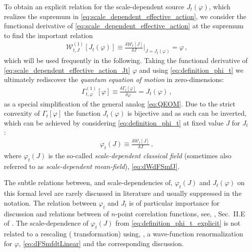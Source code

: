 To obtain an explicit relation for the scale-dependent source $J_t ( \varphi )$, which realizes the supremum in \cref{eq:scale_dependent_effective_action}, we consider the functional derivative of \cref{eq:scale_dependent_effective_action} at the supremum to find the important relation
\begin{align}
	\mathcal{W}_{t,J}^{(1)}[J_t(\varphi)] \equiv \frac{\delta \mathcal{W}_t [J]}{\delta J}\bigg|_{J=J_t(\varphi)} = \varphi \, ,	\label{eq:definition_phi_t}
\end{align}
which will be used frequently in the following.
Taking the functional derivative of \cref{eq:scale_dependent_effective_action_Jt} \wrt{} $\varphi$ and using \cref{eq:definition_phi_t} we ultimately rediscover the \textit{quantum equation of motion} in zero-dimensions:
\begin{align}
	\Gamma^{(1)}_{t, \varphi}[\varphi] \equiv \frac{\delta \Gamma_t [\varphi]}{\delta \varphi} = J_t(\varphi) \, ,	\label{eq:definition_j_t}
\end{align}
as a special simplification of the general analog \eqref{eq:QEOM}.
Due to the strict convexity of $\Gamma_t [ \varphi ]$ the function $J_t ( \varphi )$ is bijective and as such can be inverted, which can be achieved by considering \cref{eq:definition_phi_t} at fixed value $J$ for $J_t$:
\begin{align}
	\varphi_t ( J ) \equiv \frac{\delta \mathcal{W}_t [ J ]}{\delta J} \, ,	\label{eq:definition_phi_t_explicit}
\end{align}
where $\varphi_t ( J )$ is the so-called \textit{scale-dependent classical field} (sometimes also referred to as \textit{scale-dependent mean-field}), \cf{} \cref{eq:dWdFSmfJ}.
	
The subtle relations between, and scale-dependencies of, $\varphi_t ( J )$ and $J_t ( \varphi )$ on this formal level are rarely discussed in literature and usually suppressed in the notation.
The relation between $\varphi_t$ and $J_t$ is of particular importance for discussion and relations between of $n$-point correlation functions, see, \eg{}, Sec.~II.E of .
The scale-dependence of $\varphi_t(J)$ from \cref{eq:definition_phi_t_explicit} is not related to a rescaling (\rg{} transformation) using, \eg{}, a wave-function renormalization for $\varphi$, \cf{} \cref{eq:dFSmfdtLinear} and the corresponding discussion.


